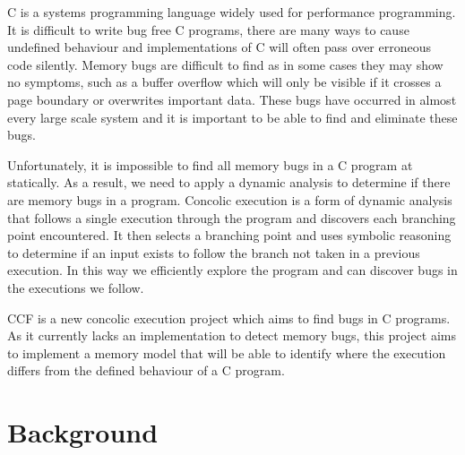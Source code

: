 \documentclass[12pt,twoside]{report}
\begin{document}
C is a systems programming language widely used for performance programming. It is difficult to write bug free C programs, there are many ways to cause undefined behaviour and implementations of C will often pass over erroneous code silently. Memory bugs are difficult to find as in some cases they may show no symptoms, such as a buffer overflow which will only be visible if it crosses a page boundary or overwrites important data. These bugs have occurred in almost every large scale system and it is important to be able to find and eliminate these bugs.

Unfortunately, it is impossible to find all memory bugs in a C program at statically. As a result, we need to apply a dynamic analysis to determine if there are memory bugs in a program. Concolic execution is a form of dynamic analysis that follows a single execution through the program and discovers each branching point encountered. It then selects a branching point and uses symbolic reasoning to determine if an input exists to follow the branch not taken in a previous execution. In this way we efficiently explore the program and can discover bugs in the executions we follow.

CCF is a new concolic execution project which aims to find bugs in C programs. As it currently lacks an implementation to detect memory bugs, this project aims to implement a memory model that will be able to identify where the execution differs from the defined behaviour of a C program. 


\chapter{Background}
\end{document}
